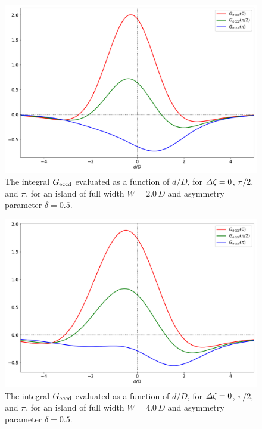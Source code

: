 \documentclass[12pt,prb,aps]{revtex4-1}
\begin{document}
\begin{figure}
\centerline{\includegraphics[width=\textwidth]{W20.pdf}}
\caption{The integral $G_{\rm eccd}$ evaluated as a function of $d/D$, for ${\mit\Delta}\zeta = 0$, $\pi/2,$ and $\pi$, for an  island
of full width $W=2.0\,D$ and asymmetry parameter $\delta=0.5$. \label{fig8}}
\end{figure}

\begin{figure}
\centerline{\includegraphics[width=\textwidth]{W40.pdf}}
\caption{The integral $G_{\rm eccd}$ evaluated as a function of $d/D$, for ${\mit\Delta}\zeta = 0$, $\pi/2,$ and $\pi$, for an  island
of full width $W=4.0\,D$ and asymmetry parameter $\delta=0.5$. \label{fig9}}
\end{figure}
\end{document}
